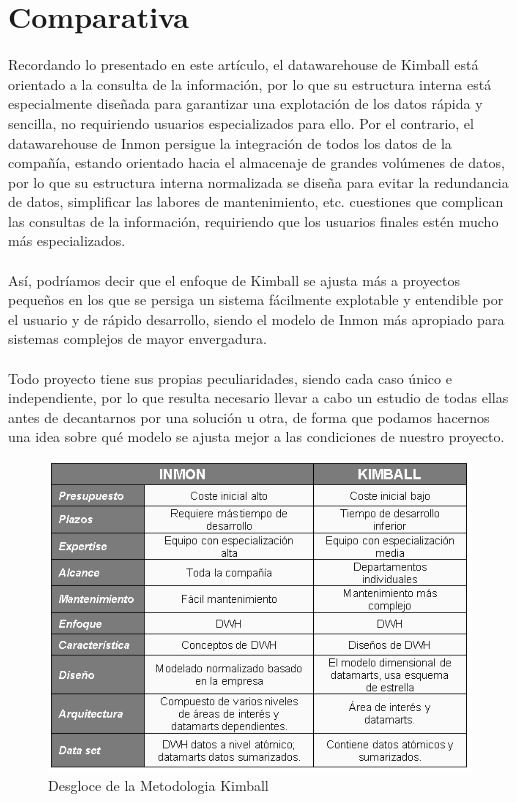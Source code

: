 \documentclass[11pt,a4paper]{article}
\begin{document}
		\section{Comparativa}
		
		Recordando lo presentado en este artículo, el datawarehouse de Kimball está orientado a la consulta de la información, por lo que su estructura interna está especialmente diseñada para garantizar una explotación de los datos rápida y sencilla, no requiriendo usuarios especializados para ello. Por el contrario, el datawarehouse de Inmon persigue la integración de todos los datos de la compañía, estando orientado hacia el almacenaje de grandes volúmenes de datos, por lo que su estructura interna normalizada se diseña para evitar la redundancia de datos, simplificar las labores de mantenimiento, etc. cuestiones que complican las consultas de la información, requiriendo que los usuarios finales estén mucho más especializados.\\
		\\
		Así, podríamos decir que el enfoque de Kimball se ajusta más a proyectos pequeños en los que se persiga un sistema fácilmente explotable y entendible por el usuario y de rápido desarrollo, siendo el modelo de Inmon más apropiado para sistemas complejos de mayor envergadura.\\
		\\
		Todo proyecto tiene sus propias peculiaridades, siendo cada caso único e independiente, por lo que resulta necesario llevar a cabo un estudio de todas ellas antes de decantarnos por una solución u otra, de forma que podamos hacernos una idea sobre qué modelo se ajusta mejor a las condiciones de nuestro proyecto.
		
		\begin{figure}[!ht]
			\begin{center}
				\includegraphics[scale=0.62]{./Imagenes/img08}	
				\caption{Desgloce de la Metodologia Kimball}		
			\end{center}
		\end{figure}
		
\end{document}
